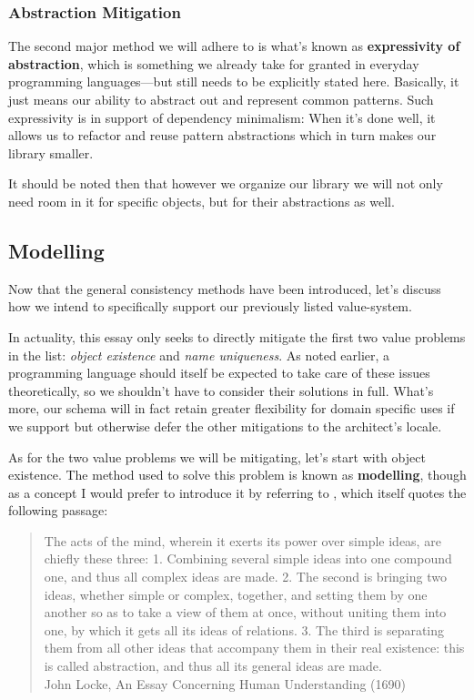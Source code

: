 \documentclass[twoside]{article}
\newcommand{\strong}[1]{{\bfseries #1}}
\begin{document}
\subsubsection*{Abstraction Mitigation}

The second major method we will adhere to is what's known as \strong{expressivity of abstraction}, which is something we
already take for granted in everyday programming languages---but still needs to be explicitly stated here. Basically, it just
means our ability to abstract out and represent common patterns. Such expressivity is in support of dependency minimalism:
When it's done well, it allows us to refactor and reuse pattern abstractions which in turn makes our library smaller.

It should be noted then that however we organize our library we will not only need room in it for specific objects,
but for their abstractions as well.

\subsection*{Modelling}

Now that the general consistency methods have been introduced, let's discuss how we intend to specifically support our
previously listed value-system.

In actuality, this essay only seeks to directly mitigate the first two value problems in the list: \emph{object existence}
and \emph{name uniqueness}. As noted earlier, a programming language should itself be expected to take care of these issues
theoretically, so we shouldn't have to consider their solutions in full. What's more, our schema will in fact retain greater
flexibility for domain specific uses if we support but otherwise defer the other mitigations to the architect's locale.

As for the two value problems we will be mitigating, let's start with object existence. The method used to solve this problem
is known as \strong{modelling}, though as a concept I would prefer to introduce it by referring to \cite{sicp}, which itself
quotes the following passage:

\begin{quotation}\small
\noindent The acts of the mind, wherein it exerts its power over simple ideas, are chiefly these three: 1. Combining several
simple ideas into one compound one, and thus all complex ideas are made. 2. The second is bringing two ideas, whether simple
or complex, together, and setting them by one another so as to take a view of them at once, without uniting them into one,
by which it gets all its ideas of relations. 3. The third is separating them from all other ideas that accompany them
in their real existence: this is called abstraction, and thus all its general ideas are made.\\[0.25ex]

\noindent John Locke, An Essay Concerning Human Understanding (1690)
\end{quotation}
\end{document}
